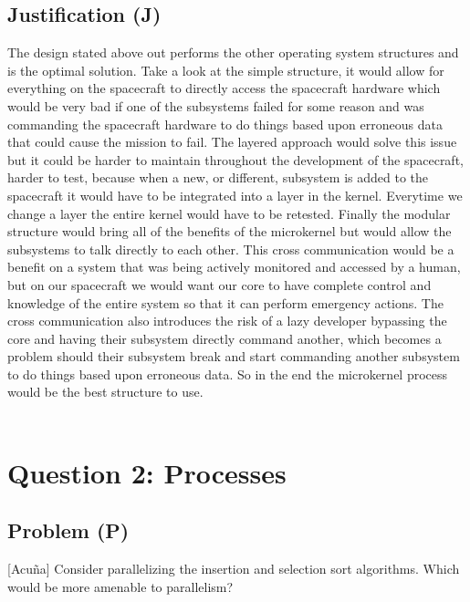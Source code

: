 \documentclass[12pt]{article}
\begin{document}
        \subsection{Justification (J)}
        The design stated above out performs the other operating system structures and is the optimal solution. Take a look at the simple
        structure, it would allow for everything on the spacecraft to directly access the spacecraft hardware which would be very bad if 
        one of the subsystems failed for some reason and was commanding the spacecraft hardware to do things based upon erroneous data that
        could cause the mission to fail. The layered approach would solve this issue but it could be harder to maintain throughout the 
        development of the spacecraft, harder to test, because when a new, or different, subsystem is added to the spacecraft it would have
        to be integrated into a layer in the kernel. Everytime we change a layer the entire kernel would have to be retested. Finally the 
        modular structure would bring all of the benefits of the microkernel but would allow the subsystems to talk directly to each other.
        This cross communication would be a benefit on a system that was being actively monitored and accessed by a human, but on our spacecraft
        we would want our core to have complete control and knowledge of the entire system so that it can perform emergency actions. The cross
        communication also introduces the risk of a lazy developer bypassing the core and having their subsystem directly command another, which
        becomes a problem should their subsystem break and start commanding another subsystem to do things based upon erroneous data. So in the end
        the microkernel process would be the best structure to use. \\
        \\

    \section{Question 2: Processes}
        \subsection{Problem (P)}
        [Acuña] Consider parallelizing the insertion and selection sort algorithms. Which would be more amenable to parallelism? \\
        \\
\end{document}
